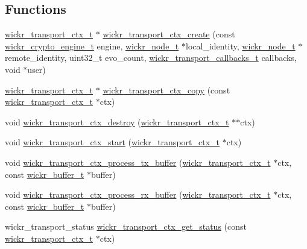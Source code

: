 \subsection*{Functions}
\begin{DoxyCompactItemize}
\item 
\hyperlink{structwickr__transport__ctx}{wickr\+\_\+transport\+\_\+ctx\+\_\+t} $\ast$ \hyperlink{group__wickr__transport__ctx_ga4731758cf20b71d4469c74904bf662c0}{wickr\+\_\+transport\+\_\+ctx\+\_\+create} (const \hyperlink{structwickr__crypto__engine}{wickr\+\_\+crypto\+\_\+engine\+\_\+t} engine, \hyperlink{structwickr__node}{wickr\+\_\+node\+\_\+t} $\ast$local\+\_\+identity, \hyperlink{structwickr__node}{wickr\+\_\+node\+\_\+t} $\ast$remote\+\_\+identity, uint32\+\_\+t evo\+\_\+count, \hyperlink{structwickr__transport__callbacks}{wickr\+\_\+transport\+\_\+callbacks\+\_\+t} callbacks, void $\ast$user)
\item 
\hyperlink{structwickr__transport__ctx}{wickr\+\_\+transport\+\_\+ctx\+\_\+t} $\ast$ \hyperlink{group__wickr__transport__ctx_gaa49b2cf44bcb02d656598a17e5ae1c52}{wickr\+\_\+transport\+\_\+ctx\+\_\+copy} (const \hyperlink{structwickr__transport__ctx}{wickr\+\_\+transport\+\_\+ctx\+\_\+t} $\ast$ctx)
\item 
void \hyperlink{group__wickr__transport__ctx_gabe547b01f4f02efea3f518d7445a71ee}{wickr\+\_\+transport\+\_\+ctx\+\_\+destroy} (\hyperlink{structwickr__transport__ctx}{wickr\+\_\+transport\+\_\+ctx\+\_\+t} $\ast$$\ast$ctx)
\item 
void \hyperlink{group__wickr__transport__ctx_gaee74761e31d5f0a6fc97e2ccf5ac1e29}{wickr\+\_\+transport\+\_\+ctx\+\_\+start} (\hyperlink{structwickr__transport__ctx}{wickr\+\_\+transport\+\_\+ctx\+\_\+t} $\ast$ctx)
\item 
void \hyperlink{group__wickr__transport__ctx_gad9d2f86832cfb9c1948ba679fabbedbc}{wickr\+\_\+transport\+\_\+ctx\+\_\+process\+\_\+tx\+\_\+buffer} (\hyperlink{structwickr__transport__ctx}{wickr\+\_\+transport\+\_\+ctx\+\_\+t} $\ast$ctx, const \hyperlink{structwickr__buffer}{wickr\+\_\+buffer\+\_\+t} $\ast$buffer)
\item 
void \hyperlink{group__wickr__transport__ctx_gad982fd3463a81a667592e18d7bf90822}{wickr\+\_\+transport\+\_\+ctx\+\_\+process\+\_\+rx\+\_\+buffer} (\hyperlink{structwickr__transport__ctx}{wickr\+\_\+transport\+\_\+ctx\+\_\+t} $\ast$ctx, const \hyperlink{structwickr__buffer}{wickr\+\_\+buffer\+\_\+t} $\ast$buffer)
\item 
wickr\+\_\+transport\+\_\+status \hyperlink{group__wickr__transport__ctx_ga3d3ffde9ec2f9f12ecb6999a048e2437}{wickr\+\_\+transport\+\_\+ctx\+\_\+get\+\_\+status} (const \hyperlink{structwickr__transport__ctx}{wickr\+\_\+transport\+\_\+ctx\+\_\+t} $\ast$ctx)
$$
\end{DoxyCompactItemize}

